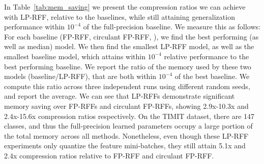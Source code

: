 In Table~\ref{tab:mem_saving} we present the compression ratios we can achieve with LP-RFF, relative to the baselines, while still attaining generalization performance within $10^{-4}$ of the full-precision baseline.  We measure this as follows:  For each baseline (FP-RFF, circulant FP-RFF, \Nystrom), we find the best performing (as well as median) model. We then find the smallest LP-RFF model, as well as the smallest baseline model, which attains within $10^{-4}$ relative performance to the best performing baseline.  We report the ratio of the memory used by these two models (baseline/LP-RFF), that are both within $10^{-4}$ of the best baseline. We compute this ratio across three independent runs using different random seeds, and report the average.  We can see that LP-RFFs demonstrate significant memory saving over FP-RFFs and circulant FP-RFFs, showing 2.9x-10.3x and 2.4x-15.6x compression ratios respectively. On the TIMIT dataset, there are 147 classes, and thus the full-precision learned parameters occupy a large portion of the total memory across all methods. Nonetheless, even though these LP-RFF experiments only quantize the feature mini-batches, they still attain 5.1x and 2.4x compression ratios relative to FP-RFF and circulant FP-RFF.

